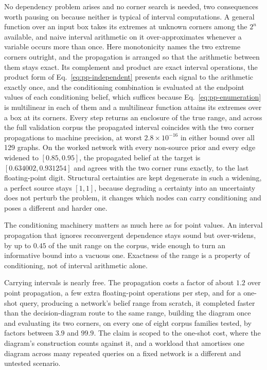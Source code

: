 \documentclass[12pt]{report}
\begin{document}
No dependency problem arises and no corner search is needed, two consequences worth pausing on because neither is typical of interval computations. A general function over an input box takes its extremes at unknown corners among the $2^n$ available, and naive interval arithmetic on it over-approximates whenever a variable occurs more than once. Here monotonicity names the two extreme corners outright, and the propagation is arranged so that the arithmetic between them stays exact. Its complement and product are exact interval operations, the product form of Eq.~\eqref{eq:pp-independent} presents each signal to the arithmetic exactly once, and the conditioning combination is evaluated at the endpoint values of each conditioning belief, which suffices because Eq.~\eqref{eq:pp-enumeration} is multilinear in each of them and a multilinear function attains its extremes over a box at its corners. Every step returns an enclosure of the true range, and across the full validation corpus the propagated interval coincides with the two corner propagations to machine precision, at worst $2.8 \times 10^{-16}$ in either bound over all 129 graphs. On the worked network with every non-source prior and every edge widened to $[0.85, 0.95]$, the propagated belief at the target is $[0.634002, 0.931254]$ and agrees with the two corner runs exactly, to the last floating-point digit. Structural certainties are kept degenerate in such a widening, a perfect source stays $[1,1]$, because degrading a certainty into an uncertainty does not perturb the problem, it changes which nodes can carry conditioning and poses a different and harder one.

The conditioning machinery matters as much here as for point values. An interval propagation that ignores reconvergent dependence stays sound but over-widens, by up to $0.45$ of the unit range on the corpus, wide enough to turn an informative bound into a vacuous one. Exactness of the range is a property of conditioning, not of interval arithmetic alone.

Carrying intervals is nearly free. The propagation costs a factor of about $1.2$ over point propagation, a few extra floating-point operations per step, and for a one-shot query, producing a network's belief range from scratch, it completed faster than the decision-diagram route to the same range, building the diagram once and evaluating its two corners, on every one of eight corpus families tested, by factors between $3.9$ and $99.9$. The claim is scoped to the one-shot cost, where the diagram's construction counts against it, and a workload that amortises one diagram across many repeated queries on a fixed network is a different and untested scenario.
\end{document}
